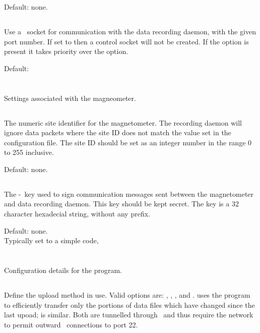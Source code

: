 Default: none.

\subsection{}
Use a \udp\ socket for communication with the data recording
daemon, with the given port number. If set to  then a
control socket will not be created. If the  option is
present it takes priority over the  option.

Default: 


\section{\code{[magnetometer]}}

Settings associated with the magneometer.

\subsection{}

The numeric site identifier for the magnetometer. The recording daemon
will ignore data packets where the site ID does not match the value
set in the configuration file. The site ID should be set as an integer
number in the range 0 to 255 inclusive.

Default: none.

\subsection{}
The \hmac-\mdfive\ key used to sign communication messages sent between
the magnetometer and data recording daemon. This key should be kept
secret. The key is a 32 character hexadecial string, without any
 prefix.

Default: none.\\
Typically set to a simple code, 



\section{\code{[upload]}}
Configuration details for the  program.

\subsection{}
Define the upload method in use. Valid options are: ,
, , and .  uses the
 program to efficiently transfer only the portions of
data files which have changed since the last upoad;  is
similar. Both are tunnelled through \ssh\ and thus require the network
to permit outward \tcp\ connections to port 22.

